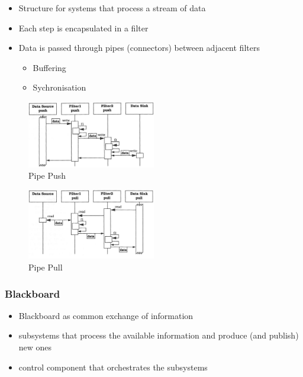 \begin{itemize}
\tightlist
\item
  Structure for systems that process a stream of data
\item
  Each step is encapsulated in a filter
\item
  Data is passed through pipes (connectors) between adjacent filters

  \begin{itemize}
  \tightlist
  \item
    Buffering
  \item
    Sychronisation
  \end{itemize}
\end{itemize}

\begin{figure}[H]
\centering
\includegraphics[width=0.5\textwidth]{figures/pipepush.png}
\caption{Pipe Push}
\end{figure}

\begin{figure}[H]
\centering
\includegraphics[width=0.5\textwidth]{figures/pipepull.png}
\caption{Pipe Pull}
\end{figure}

\hypertarget{blackboard}{%
\subsubsection{Blackboard}\label{blackboard}}

\begin{itemize}
\tightlist
\item
  Blackboard as common exchange of information
\item
  subsystems that process the available information and produce (and
  publish) new ones
\item
  control component that orchestrates the subsystems
\end{itemize}

